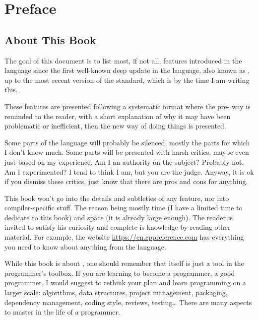\chapter{Preface}

\section{About This Book}
The goal of this document is to list most, if not all, features
introduced in the \cpp language since the first well-known deep update
in the language, also known as , up to the most recent version
of the standard, which is  by the time I am writing this.

These features are presented following a systematic format where the
pre- way is reminded to the reader, with a short explanation of
why it may have been problematic or inefficient, then the new way of
doing things is presented.

Some parts of the language will probably be silenced, mostly the parts
for which I don't know much. Some parts will be presented with harsh
critics, maybe even just based on my experience. Am I an authority on
the subject? Probably not. Am I experimented? I tend to think I am,
but you are the judge. Anyway, it is ok if you dismiss these critics,
just know that there are pros and cons for anything.

This book won't go into the details and subtleties of any feature,
nor into compiler-specific stuff. The reason being mostly time (I have
a limited time to dedicate to this book) and space (it is already
large enough). The reader is invited to satisfy his curiosity and
complete is knowledge by reading other material. For example, the
website \url{https://en.cppreference.com} has everything you need to
know about anything from the language.

\bigskip

While this book is about \cpp, one should remember that \cpp{} itself
is just a tool in the programmer's toolbox. If you are learning \cpp{}
to become a programmer, a good programmer, I would suggest to rethink
your plan and learn programming on a larger scale: algorithms, data
structures, project management, packaging, dependency management,
coding style, reviews, testing… There are many aspects to master in
the life of a programmer.

